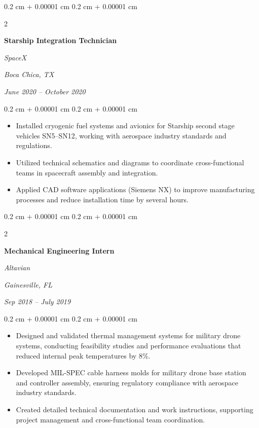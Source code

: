\documentclass[10pt, letterpaper]{article}
\newenvironment{highlights}{
    \begin{itemize}[
        topsep=0.10 cm,
        parsep=0.10 cm,
        partopsep=0pt,
        itemsep=0pt,
        leftmargin=0.4 cm + 10pt
    ]
}{
    \end{itemize}
} %
\newenvironment{onecolentry}{
    \begin{adjustwidth}{
        0.2 cm + 0.00001 cm
    }{
        0.2 cm + 0.00001 cm
    }
}{
    \end{adjustwidth}
} %
\newenvironment{twocolentry}[2][]{
    \onecolentry
    \def\secondColumn{#2}
    \setcolumnwidth{\fill, 9.0 cm}
    \begin{paracol}{2}
}{
    \switchcolumn \raggedleft \secondColumn
    \end{paracol}
    \endonecolentry
} %
\begin{document}
        \vspace{0.35 cm}

        \begin{twocolentry}{
        \textit{Boca Chica, TX}    
            
        \textit{June 2020 – October 2020}}
            \textbf{Starship Integration Technician}
            
            \textit{SpaceX}
        \end{twocolentry}

        \vspace{0.10 cm}
        \begin{onecolentry}
            \begin{highlights}
                \item Installed cryogenic fuel systems and avionics for Starship second stage vehicles SN5–SN12, working with aerospace industry standards and regulations.
                \item Utilized technical schematics and diagrams to coordinate cross-functional teams in spacecraft assembly and integration.
                \item Applied CAD software applications (Siemens NX) to improve manufacturing processes and reduce installation time by several hours.
            \end{highlights}
        \end{onecolentry}

        \vspace{0.35 cm}

        \begin{twocolentry}{
        \textit{Gainesville, FL}    
            
        \textit{Sep 2018 – July 2019}}
            \textbf{Mechanical Engineering Intern}
            
            \textit{Altavian}
        \end{twocolentry}

        \vspace{0.10 cm}
        \begin{onecolentry}
            \begin{highlights}
                \item Designed and validated thermal management systems for military drone systems, conducting feasibility studies and performance evaluations that reduced internal peak temperatures by 8\%.
                \item Developed MIL-SPEC cable harness molds for military drone base station and controller assembly, ensuring regulatory compliance with aerospace industry standards.
                \item Created detailed technical documentation and work instructions, supporting project management and cross-functional team coordination.
            \end{highlights}
        \end{onecolentry}
\end{document}
